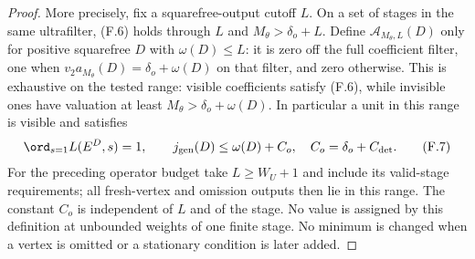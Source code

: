 \begin{proof}
More precisely, fix a squarefree-output cutoff $L$. On a set of
stages in the same ultrafilter, (F.6) holds through $L$ and
$M_\theta>\delta_o+L$. Define $\mathcal A_{M_\theta,L}(D)$ only
for positive squarefree $D$ with $\omega(D)\le L$: it is zero off the full coefficient filter,
one when $v_2a_{M_\theta}(D)=\delta_o+\omega(D)$ on that filter,
and zero otherwise. This is exhaustive on the tested range:
visible coefficients satisfy (F.6), while invisible ones have
valuation at least $M_\theta>\delta_o+\omega(D)$.
In particular a unit in this range is visible and satisfies
\[
 \ord_{s=1}L(E^D,s)=1,\qquad
        j_{\rm gen}(D)\le\omega(D)+C_o,\quad C_o=\delta_o+C_{\rm det}.
 \tag{F.7}
\]
For the preceding operator budget take $L\ge W_U+1$ and include
its valid-stage requirements; all fresh-vertex and omission outputs
then lie in this range. The constant $C_o$ is independent of $L$
and of the stage. No value is assigned by this definition at
unbounded weights of one finite stage. No minimum is changed when
a vertex is omitted or a stationary condition is later added.
\end{proof}


